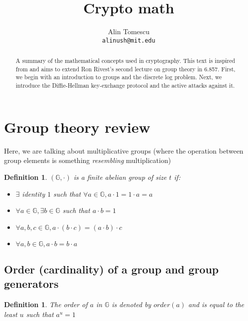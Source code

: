 \documentclass[12pt]{article}
\newtheorem{definition}[thm]{Definition}
\newcommand{\G}{\mathbb{G}}
\begin{document}
\title{Crypto math}
\author{Alin Tomescu\\
  \texttt{alinush@mit.edu}}

\maketitle

\begin{abstract}
A summary of the mathematical concepts used in cryptography. This text is inspired from and aims to extend Ron Rivest's second lecture on group theory in 6.857. First, we begin with an introduction to groups and the discrete log problem. Next, we introduce the Diffie-Hellman key-exchange protocol and the active attacks against it.
\end{abstract}

\tableofcontents

\newpage

\section{Group theory review}

Here, we are talking about multiplicative groups (where the operation between
group elements is something \emph{resembling} multiplication)

\begin{definition}
$(\G, \cdot)$ is a \emph{finite abelian group} of size $t$ if:
\begin{itemize}
  \item $\exists$ identity $1$ such that $\forall a \in \G, a\cdot 1 = 1\cdot a = a$
  \item $\forall a     \in \G, \exists b \in \G$ such that $a\cdot b = 1$
  \item $\forall a,b,c \in \G, a\cdot (b\cdot c) = (a\cdot b)\cdot c$
  \item $\forall a,b   \in \G, a\cdot b = b\cdot a$
\end{itemize}
\end{definition}

\subsection{Order (cardinality) of a group and group generators}

\begin{definition}
The \emph{order} of $a$ in $\G$ is denoted by $order(a)$ and is equal to the least $u$ such that $a^u = 1$
\end{definition}
\end{document}
